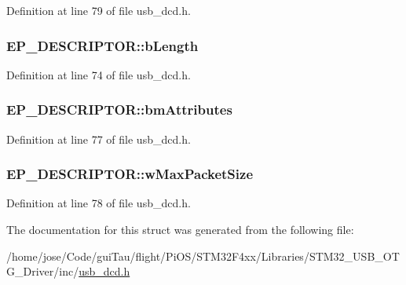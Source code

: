 Definition at line 79 of file usb\-\_\-dcd.\-h.

\hypertarget{struct_e_p___d_e_s_c_r_i_p_t_o_r_a3e0aed7d11a9507e627ff5a4cfcc3b77}{
\subsubsection[{b\-Length}]{ E\-P\-\_\-\-D\-E\-S\-C\-R\-I\-P\-T\-O\-R\-::b\-Length}}\label{struct_e_p___d_e_s_c_r_i_p_t_o_r_a3e0aed7d11a9507e627ff5a4cfcc3b77}


Definition at line 74 of file usb\-\_\-dcd.\-h.

\hypertarget{struct_e_p___d_e_s_c_r_i_p_t_o_r_a04a3ac3a30a940a6e37621a94c6d6058}{
\subsubsection[{bm\-Attributes}]{ E\-P\-\_\-\-D\-E\-S\-C\-R\-I\-P\-T\-O\-R\-::bm\-Attributes}}\label{struct_e_p___d_e_s_c_r_i_p_t_o_r_a04a3ac3a30a940a6e37621a94c6d6058}


Definition at line 77 of file usb\-\_\-dcd.\-h.

\hypertarget{struct_e_p___d_e_s_c_r_i_p_t_o_r_a8f9c7afe59182c066937c317538403be}{
\subsubsection[{w\-Max\-Packet\-Size}]{ E\-P\-\_\-\-D\-E\-S\-C\-R\-I\-P\-T\-O\-R\-::w\-Max\-Packet\-Size}}\label{struct_e_p___d_e_s_c_r_i_p_t_o_r_a8f9c7afe59182c066937c317538403be}


Definition at line 78 of file usb\-\_\-dcd.\-h.



The documentation for this struct was generated from the following file\-:\begin{DoxyCompactItemize}
\item 
/home/jose/\-Code/gui\-Tau/flight/\-Pi\-O\-S/\-S\-T\-M32\-F4xx/\-Libraries/\-S\-T\-M32\-\_\-\-U\-S\-B\-\_\-\-O\-T\-G\-\_\-\-Driver/inc/\hyperlink{usb__dcd_8h}{usb\-\_\-dcd.\-h}\end{DoxyCompactItemize}
